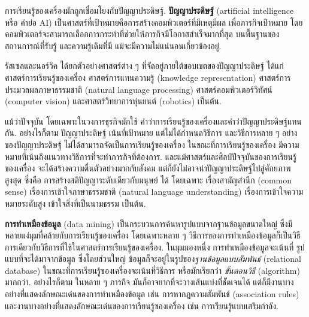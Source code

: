 การเรียนรู้ของเครื่องมักถูกเชื่อมโยงกับปัญญาประดิษฐ์.
\textbf{ปัญญาประดิษฐ์} (artificial intelligence หรือ คำย่อ AI)
เป็นศาสตร์ที่เป้าหมายคือการสร้างคอมพิวเตอร์ที่มีเหตุมีผล
เพื่อภารกิจเป้าหมาย โดยคอมพิวเตอร์จะสามารถเลือกการกระทำที่ช่วยให้ภารกิจมีโอกาสสำเร็จมากที่สุด บนพื้นฐานของสถานการณ์ที่รับรู้ และความรู้เดิมที่มี แม้จะมีความไม่แน่นอนเกี่ยวข้องอยู่.

รัสเซลและนอร์วิค\cite{RussellNorvig2009}
ได้ยกตัวอย่างศาสตร์ต่าง ๆ ที่จัดอยู่ภายใต้ขอบเขตของปัญญาประดิษฐ์
ได้แก่
ศาสตร์การเรียนรู้ของเครื่อง
ศาสตร์การแทนความรู้ (knowledge representation)
ศาสตร์การประมวลผลภาษาธรรมชาติ (natural language processing)
ศาสตร์คอมพิวเตอร์วิทัศน์ (computer vision)
และศาสตร์วิทยาการหุ่นยนต์ (robotics)
เป็นต้น.

แม้ว่าปัจจุบัน โดยเฉพาะในวงการธุรกิจมักใช้
คำว่าการเรียนรู้ของเครื่องและคำว่าปัญญาประดิษฐ์แทนกัน.
อย่างไรก็ตาม
ปัญญาประดิษฐ์ เน้นที่เป้าหมาย แต่ไม่ได้กำหนดวิธีการ และวิธีการหลาย ๆ อย่างของปัญญาประดิษฐ์ ไม่ได้สามารถจัดเป็นการเรียนรู้ของเครื่อง
ในขณะที่การเรียนรู้ของเครื่อง มีความหมายที่เน้นถึงแนวทางวิธีการที่จะทำภารกิจที่ต้องการ.
และแม้ศาสตร์และศิลป์ปัจจุบันของการเรียนรู้ของเครื่อง
จะได้สร้างความตื่นตัวอย่างมากกับสังคม
แต่ก็ยังไม่อาจนำปัญญาประดิษฐ์ไปสู่ศักยภาพสูงสุด
ซึ่งคือ การสร้างสติปัญญาระดับเดียวกับมนุษย์ ได้
โดยเฉพาะ 
เรื่องสามัญสำนึก (common sense) เรื่องการเข้าใจภาษาธรรมชาติ (natural language understanding)
เรื่องการเข้าใจความหมายระดับสูง เข้าใจสิ่งที่เป็นนามธรรม เป็นต้น.

\textbf{การทำเหมืองข้อมูล} (data mining)
เป็นกระบวนการค้นหารูปแบบจากฐานข้อมูลขนาดใหญ่
ซึ่งมีหลายแง่มุมที่คล้ายกับการเรียนรู้ของเครื่อง โดยเฉพาะหลาย ๆ วิธีการของการทำเหมืองข้อมูลก็เป็นวิธีการเดียวกับวิธีการที่ใช้ในศาสตร์การเรียนรู้ของเครื่อง.
%
ในมุมมองหนึ่ง การทำเหมืองข้อมูลจะเน้นที่ รูปแบบที่จะได้มาจากข้อมูล 
ซึ่งโดยส่วนใหญ่
ข้อมูลก็จะอยู่ในรูปของ\textit{ฐานข้อมูลแบบสัมพันธ์} (relational database)
ในขณะที่การเรียนรู้ของเครื่องจะเน้นที่วิธีการ หรือมักเรียกว่า \textit{ขั้นตอนวิธี} (algorithm) มากกว่า.
%
อย่างไรก็ตาม ในหลาย ๆ ภารกิจ มันก็อาจยากที่จะวางเส้นแบ่งที่ชััดเจนได้
แต่ก็มีงานบางอย่างที่แสดงลักษณะเด่นของการทำเหมืองข้อมูล เช่น การหากฎความสัมพันธ์ (association rules)
และงานบางอย่างที่แสดงลักษณะเด่นของการเรียนรู้ของเครื่อง
เช่น การเรียนรู้แบบเสริมกำลัง.


